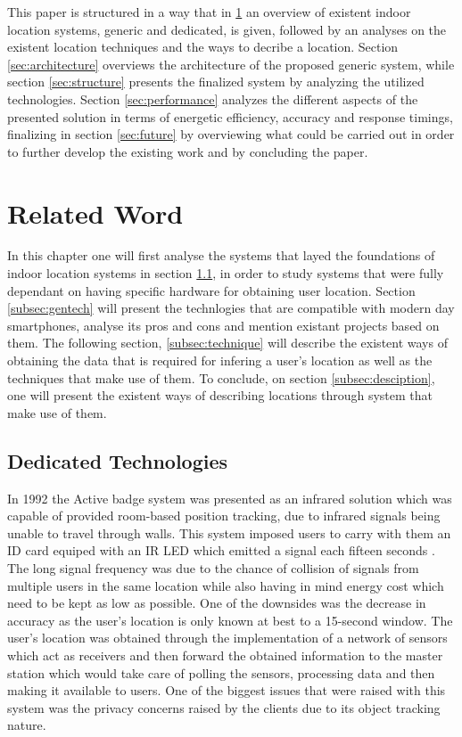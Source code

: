 \documentclass[a4paper]{IEEEtran}
\begin{document}
This paper is structured in a way that in \ref{sec:related} an overview of existent indoor location systems, generic and dedicated, is given, followed by an analyses on the existent location techniques and the ways to decribe a location. Section \ref{sec:architecture} overviews the architecture of the proposed generic system, while section \ref{sec:structure} presents the finalized system by analyzing the utilized technologies. Section \ref{sec:performance} analyzes the different aspects of the presented solution in terms of energetic efficiency, accuracy and response timings, finalizing in section \ref{sec:future} by overviewing what could be carried out in order to further develop the existing work and by concluding the paper.


\section{Related Word}
\label{sec:related}

In this chapter one will first analyse the systems that layed the foundations of indoor location systems in section \ref{subsec:dedicated}, in order to study systems that were fully dependant on having specific hardware for obtaining user location. Section \ref{subsec:gentech} will present the technlogies that are compatible with modern day smartphones, analyse its pros and cons and mention existant projects based on them. The following section, \ref{subsec:technique} will describe the existent ways of obtaining the data that is required for infering a user's location as well as the techniques that make use of them. To conclude, on section \ref{subsec:desciption}, one will present the existent ways of describing locations through system that make use of them.

\subsection{Dedicated Technologies}
\label{subsec:dedicated}

In 1992 the Active badge system \cite{badge} was presented as an infrared solution which was capable of provided room-based position tracking, due to infrared signals being unable to travel through walls. This system imposed users to carry with them an ID card equiped with an IR LED which emitted a signal each fifteen seconds \cite{badge1, badge2}. The long signal frequency was due to the chance of collision of signals from multiple users in the same location while also having in mind energy cost which need to be kept as low as possible. One of the downsides was the decrease in accuracy as the user's location is only known at best to a 15-second window. The user's location was obtained  through the implementation of a network of sensors which act as receivers and then forward the obtained information to the master station which would take care of polling the sensors, processing data and then making it available to users. One of the biggest issues that were raised with this system was the privacy concerns raised by the clients due to its object tracking nature.
\end{document}
